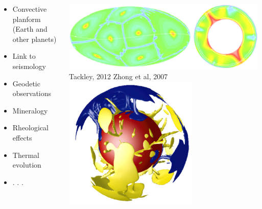 \documentclass[t,compress=false,usepdftitle=false]{beamer}
\begin{document}
\begin{frame}
\begin{columns}
\vspace{-6mm}
\begin{myColorBox}{.95}{}\color{linkcolor}
\centering
\begin{itemize}
 \item Convective planform (Earth and other planets)
 \item Link to seismology
 \item Geodetic observations
 \item Mineralogy
 \item Rheological effects
 \item Thermal evolution
 \item . . .
\end{itemize}
\end{myColorBox}
\vspace{-3mm}
\includegraphics[width=1\textwidth]{tackley_12.png}\\ \scriptsize{Tackley, 2012}
\vspace{-4mm}
\scriptsize{Zhong et al, 2007}\\
\includegraphics[width=0.65\textwidth]{zhong_07.png}\\

\end{columns}
\end{frame}
\end{document}
